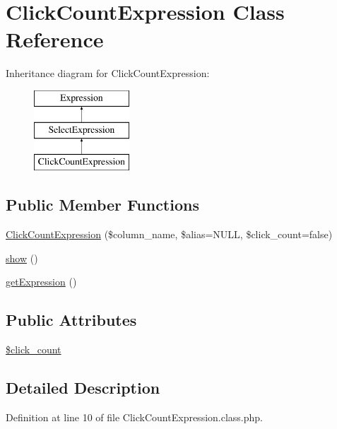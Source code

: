 \hypertarget{classClickCountExpression}{}\section{Click\+Count\+Expression Class Reference}
\label{classClickCountExpression}
Inheritance diagram for Click\+Count\+Expression\+:\begin{figure}[H]
\begin{center}
\leavevmode
\includegraphics[height=3.000000cm]{classClickCountExpression}
\end{center}
\end{figure}
\subsection*{Public Member Functions}
\begin{DoxyCompactItemize}
\item 
\hyperlink{classClickCountExpression_afc3cb0cccfbcad19bf50ef591d77318b}{Click\+Count\+Expression} (\$column\+\_\+name, \$alias=N\+U\+LL, \$click\+\_\+count=false)
\item 
\hyperlink{classClickCountExpression_a19b7767f37c3dd3461db66b741ff83f6}{show} ()
\item 
\hyperlink{classClickCountExpression_acd86ecac8f6416d56024e241ba115473}{get\+Expression} ()
\end{DoxyCompactItemize}
\subsection*{Public Attributes}
\begin{DoxyCompactItemize}
\item 
\hyperlink{classClickCountExpression_ae2f2beae2bcbb1e22dac9f84853a1226}{\$click\+\_\+count}
\end{DoxyCompactItemize}


\subsection{Detailed Description}


Definition at line 10 of file Click\+Count\+Expression.\+class.\+php.



